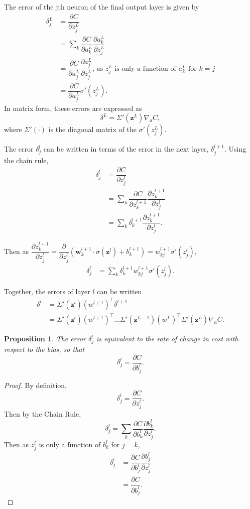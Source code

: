 \documentclass[honours,12pt]{unswthesis}
\newtheorem{proposition}[theorem]{Proposition}
\numberwithin{equation}{section}
\begin{document}

The error of the jth neuron of the final output layer is given by
\begin{align*}
	\delta_j^L & = \dfrac{\partial C}{\partial z_j^L} \\
	& = \sum_k\dfrac{\partial C}{\partial a_k^L}\dfrac{\partial a_k^L}{\partial z_j^L} \\
	& = \dfrac{\partial C}{\partial a_j^L}\dfrac{\partial a_j^L}{\partial z_j^L}\text{, as }z_j^L\text{ is only a function of }a_k^L\text{ for }k = j \\
	& = \dfrac{\partial C}{\partial a_j^L}\sigma'(z_j^L).
\end{align*}
In matrix form, these errors are expressed as
\[
	\delta^L = \Sigma'(\mathbf{z}^L)\nabla_aC,
\]
where $\Sigma'(\cdot)$ is the diagonal matrix of the $\sigma'(z_j^L)$.

The error $\delta_j^l$ can be written in terms of the error in the next layer, $\delta_j^{l+1}$. Using the chain rule,
\begin{align*}
	\delta_j^l & = \dfrac{\partial C}{\partial z_j^l} \\
	& = \sum_k\dfrac{\partial C}{\partial z_k^{l+1}}\dfrac{\partial z_k^{l+1}}{\partial z_j^l} \\
	& = \sum_k\delta_k^{l+1}\dfrac{\partial z_k^{l+1}}{\partial z_j^l}.
\end{align*}

Then as $\dfrac{\partial z_k^{l+1}}{\partial z_j^l} = \dfrac{\partial}{\partial z_j^l}(\mathbf{w}_k^{l+1}\cdot\sigma(\mathbf{z}^{l}) + b_k^{l+1}) = w_{kj}^{l+1}\sigma'(z_j^l)$,
\begin{align*}
	\delta_j^l & = \sum_k\delta_k^{l+1}w_{kj}^{l+1}\sigma'(z_j^l).
\end{align*}

Together, the errors of layer $l$ can be written
\begin{align*}
	\delta^l & = \Sigma'(\mathbf{z}^l)(w^{l+1})^\top\delta^{l+1} \\
	& = \Sigma'(\mathbf{z}^l)(w^{l+1})^\top\ldots\Sigma'(\mathbf{z}^{L-1})(w^L)^\top\Sigma'(\mathbf{z}^L)\nabla_aC.
\end{align*}

\begin{proposition}
	The error $\delta_j^l$ is equivalent to the rate of change in cost with respect to the bias, so that
	\[
		\delta_j^l = \dfrac{\partial C}{\partial b_j^l}.
	\]
\end{proposition}
\begin{proof}
	By definition,
	\[
		\delta_j^l = \dfrac{\partial C}{\partial z_j^l}.
	\]
	Then by the Chain Rule,
	\[
		\delta_j^l = \sum_k\dfrac{\partial C}{\partial b_k^l}\dfrac{\partial b_k^l}{\partial z_j^l}.
	\]
	Then as $z_j^l$ is only a function of $b_k^l$ for $j = k$,
	\begin{align*}
		\delta_j^l & = \dfrac{\partial C}{\partial b_j^l}\dfrac{\partial b_j^l}{\partial z_j^l} \\
		& = \dfrac{\partial C}{\partial b_j^l}.
	\end{align*}
\end{proof}
\end{document}
